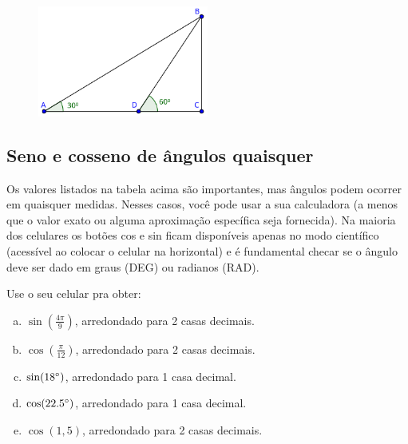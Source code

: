 \documentclass[main.tex]{subfiles}
\begin{document}
\begin{figure}[h]
\centering
\includegraphics[width=0.5\textwidth]{./img/c4q1.png}
\end{figure}

\subsection*{Seno e cosseno de ângulos quaisquer}

Os valores listados na tabela acima são importantes, mas ângulos podem ocorrer em quaisquer medidas. Nesses casos, você pode usar a sua calculadora (a menos que o valor exato ou alguma aproximação específica seja fornecida). Na maioria dos celulares os botões cos e sin ficam disponíveis apenas no modo científico (acessível ao colocar o celular na horizontal) e é fundamental checar se o ângulo deve ser dado em graus (DEG) ou radianos (RAD).

\begin{questao}
 Use o seu celular pra obter:
\begin{enumerate}[a)]
\item $\sin(\frac{4\pi}{9})$, arredondado para 2 casas decimais.
\item $\cos(\frac{\pi}{12})$, arredondado para 2 casas decimais.
\item $\sin(18\degree)$, arredondado para 1 casa decimal.
\item $\cos(22.5\degree)$, arredondado para 1 casa decimal.
\item $\cos(1,5)$, arredondado para 2 casas decimais.
\end{enumerate}
\end{questao}
\end{document}
